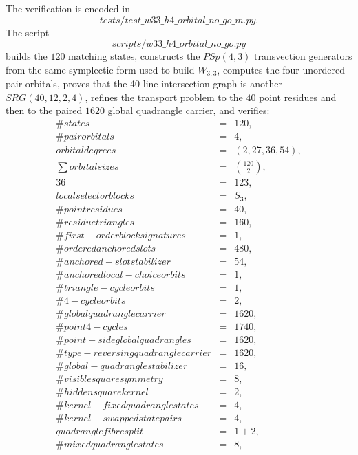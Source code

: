 \documentclass[12pt,a4paper]{article}
\def\mathrm#1{#1}%
\def\texttt#1{#1}%
\def\text#1{#1}%
\def\cdot{ }%
\theoremstyle{definition}
\newcommand{\SRG}{\mathrm{SRG}}
\newcommand{\PSp}{\mathrm{PSp}}
\begin{document}
The verification is encoded in
\[
\texttt{tests/test\_w33\_h4\_orbital\_no\_go\_m.py}.
\]
The script
\[
\texttt{scripts/w33\_h4\_orbital\_no\_go.py}
\]
builds the $120$ matching states, constructs the $\PSp(4,3)$
transvection generators from the same symplectic form used to build
$W_{3,3}$, computes the four unordered pair orbitals, proves that the
40-line intersection graph is another $\SRG(40,12,2,4)$, refines the
transport problem to the $40$ point residues and then to the paired
$1620$ global quadrangle carrier, and verifies:
\[
\begin{array}{rcl}
\#\text{states} &=& 120,\\
\#\text{pair orbitals} &=& 4,\\
\text{orbital degrees} &=& (2,27,36,54),\\
\sum\text{orbital sizes} &=& \binom{120}{2},\\
36 &=& 12\cdot 3,\\
\text{local selector blocks} &=& S_3,\\
\#\text{point residues} &=& 40,\\
\#\text{residue triangles} &=& 160,\\
\#\text{first-order block signatures} &=& 1,\\
\#\text{ordered anchored slots} &=& 480,\\
\#\text{anchored-slot stabilizer} &=& 54,\\
\#\text{anchored local-choice orbits} &=& 1,\\
\#\text{triangle-cycle orbits} &=& 1,\\
\#\text{4-cycle orbits} &=& 2,\\
\#\text{global quadrangle carrier} &=& 1620,\\
\#\text{point 4-cycles} &=& 1740,\\
\#\text{point-side global quadrangles} &=& 1620,\\
\#\text{type-reversing quadrangle carrier} &=& 1620,\\
\#\text{global-quadrangle stabilizer} &=& 16,\\
\#\text{visible square symmetry} &=& 8,\\
\#\text{hidden square kernel} &=& 2,\\
\#\text{kernel-fixed quadrangle states} &=& 4,\\
\#\text{kernel-swapped state pairs} &=& 4,\\
\text{quadrangle fibre split} &=& 1+2,\\
\#\text{mixed quadrangle states} &=& 8,\\

\end{array}\]
\end{document}
